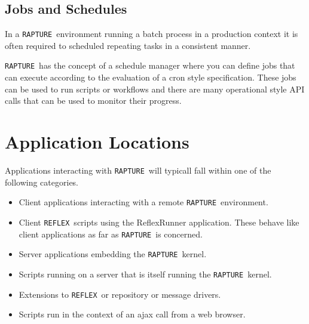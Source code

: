 \documentclass[12pt,twoside,a4paper]{book}
\newcommand{\Rapture}{\Verb+RAPTURE+~}
\newcommand{\Reflex}{\Verb+REFLEX+~}
\begin{document}
\section{Jobs and Schedules}

In a \Rapture environment running a batch process in a production context it is often required to scheduled repeating tasks in a consistent manner.

\Rapture has the concept of a schedule manager where you can define jobs that can execute according to the evaluation of a cron style specification. These jobs
can be used to run scripts or workflows and there are many operational style API calls that can be used to monitor their progress.


\chapter{Application Locations}
Applications interacting with \Rapture will typicall fall within one of the
following categories.

\begin{itemize}
  \item{Client applications interacting with a remote \Rapture environment.}
  \item{Client \Reflex scripts using the ReflexRunner application. These behave like client applications as far as \Rapture is concerned.}
  \item{Server applications embedding the \Rapture kernel.}
  \item{Scripts running on a server that is itself running the \Rapture kernel.}
  \item{Extensions to \Reflex or repository or message drivers.}
  \item{Scripts run in the context of an ajax call from a web browser.}
\end{itemize}
\end{document}
